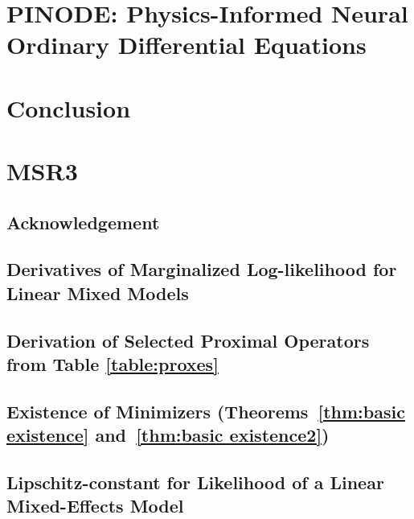 \documentclass[12pt,a4paper]{book}
\numberwithin{equation}{section} %
\numberwithin{figure}{section} %
\numberwithin{table}{section} %
\begin{document}
\chapter{PINODE: Physics-Informed Neural Ordinary Differential Equations}
\label{ch:pinode}




\chapter*{Conclusion}





\clearpage


\appendix
\chapter{MSR3}

\section*{Acknowledgement}


\section{Derivatives of Marginalized Log-likelihood for Linear Mixed Models}
\label{appendix:derivatives_of_lmm}


\section{Derivation of Selected Proximal Operators from Table \ref{table:proxes}}
\label{appendix:proxes}


\section{Existence of Minimizers (Theorems~\ref{thm:basic existence} and~\ref{thm:basic existence2})}
\label{adx:basic existence}


\section{Lipschitz-constant for Likelihood of a Linear Mixed-Effects Model}
\label{appendix:lipschitz_constant}

\end{document}
